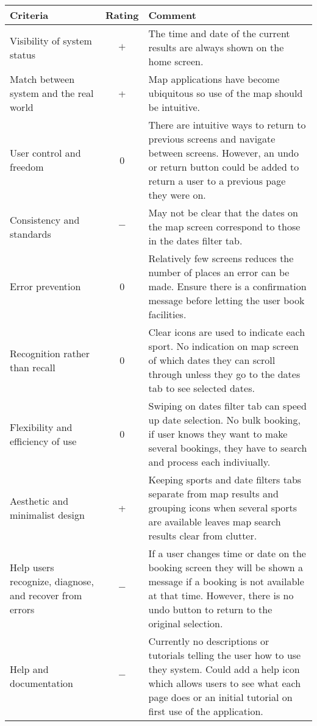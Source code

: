 \begin{center}
	\renewcommand{\arraystretch}{2}
	\begin{longtable}{p{} c p{}}
		\toprule
		\textbf{Criteria} & \textbf{Rating} & \textbf{Comment}\\
		\midrule
		Visibility of system status & $+$ & The time and date of the current
		results are always shown on the home screen.\\

		Match between system and the real world & + & Map applications have
		become ubiquitous so use of the map should be intuitive.\\

		User control and freedom & 0 & There are intuitive ways to return to
		previous screens and navigate between screens. However, an undo or
		return button could be added to return a user to a previous page they
		were on.\\

		Consistency and standards & $-$ & May not be clear that the dates on
		the map screen correspond to those in the dates filter tab.\\

		Error prevention & 0 & Relatively few screens reduces the number of
		places an error can be made. Ensure there is a confirmation message
		before letting the user book facilities.\\

		Recognition rather than recall & 0 & Clear icons are used to indicate
		each sport. No indication on map screen of which dates they can scroll
		through unless they go to the dates tab to see selected dates.\\

		Flexibility and efficiency of use & 0 & Swiping on dates filter tab can
		speed up date selection. No bulk booking, if user knows they want to
		make several bookings, they have to search and process each
		indiviually. \\

		Aesthetic and minimalist design & + & Keeping sports and date filters
		tabs separate from map results and grouping icons when several sports
		are available leaves map search results clear from clutter.\\

		Help users recognize, diagnose, and recover from errors & $-$ & If a
		user changes time or date on the booking screen they will be shown a
		message if a booking is not available at that time. However, there is
		no undo button to return to the original selection.\\

		Help and documentation & $-$ & Currently no descriptions or tutorials
		telling the user how to use they system. Could add a help icon which
		allows users to see what each page does or an initial tutorial on first
		use of the application.\\
		\bottomrule
	\end{longtable}
\end{center}

